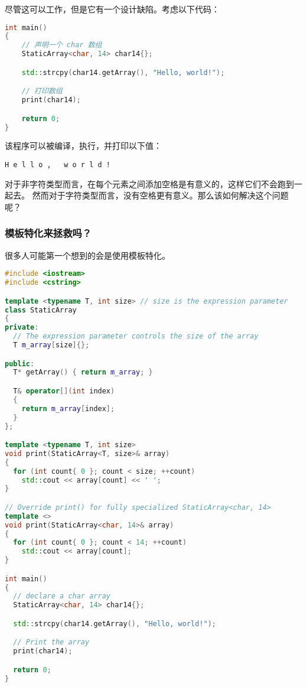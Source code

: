 \documentclass[../../LearnCpp.tex]{subfiles}
\begin{document}
尽管这可以工作，但是它有一个设计缺陷。考虑以下代码：

\begin{lstlisting}[language=C++]
int main()
{
    // 声明一个 char 数组
    StaticArray<char, 14> char14{};

    std::strcpy(char14.getArray(), "Hello, world!");

    // 打印数组
    print(char14);

    return 0;
}
\end{lstlisting}

该程序可以被编译，执行，并打印以下值：

\begin{lstlisting}
H e l l o ,   w o r l d !
\end{lstlisting}

对于非字符类型而言，在每个元素之间添加空格是有意义的，这样它们不会跑到一起去。
然而对于字符类型而言，没有空格更有意义。那么该如何解决这个问题呢？

\subsubsection*{模板特化来拯救吗？}

很多人可能第一个想到的会是使用模板特化。

\begin{lstlisting}[language=C++]
#include <iostream>
#include <cstring>

template <typename T, int size> // size is the expression parameter
class StaticArray
{
private:
  // The expression parameter controls the size of the array
  T m_array[size]{};

public:
  T* getArray() { return m_array; }

  T& operator[](int index)
  {
    return m_array[index];
  }
};

template <typename T, int size>
void print(StaticArray<T, size>& array)
{
  for (int count{ 0 }; count < size; ++count)
    std::cout << array[count] << ' ';
}

// Override print() for fully specialized StaticArray<char, 14>
template <>
void print(StaticArray<char, 14>& array)
{
  for (int count{ 0 }; count < 14; ++count)
    std::cout << array[count];
}

int main()
{
  // declare a char array
  StaticArray<char, 14> char14{};

  std::strcpy(char14.getArray(), "Hello, world!");

  // Print the array
  print(char14);

  return 0;
}
\end{lstlisting}
\end{document}
